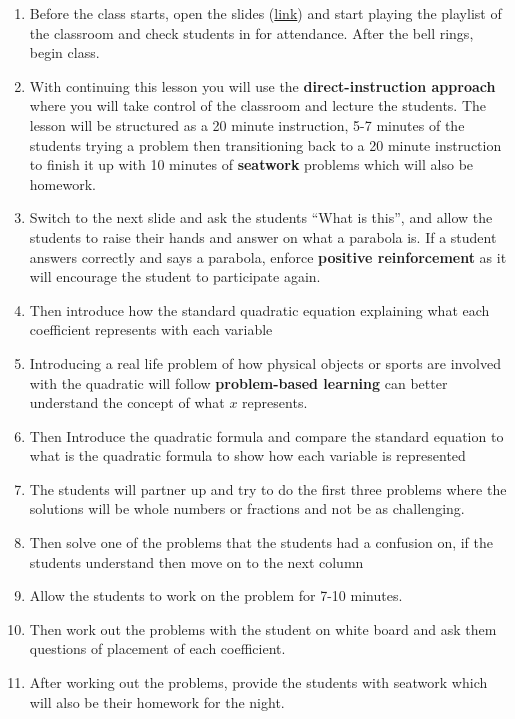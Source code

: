 \begin{enumerate}
    \item Before the class starts, open the slides (\href{https://docs.google.com/presentation/d/19ciZDfXd51fivbBudBNQqxBPUnCx569onL82jkyxO34/edit#slide=id.p}{link}) and start playing the playlist of the classroom and check students in for attendance. After the bell rings, begin class.
    \item With continuing this lesson you will use the \textbf{direct-instruction approach} where you will take control of the classroom and lecture the students. The lesson will be structured as a 20 minute instruction, 5-7 minutes of the students trying a problem then transitioning back to a 20 minute instruction to finish it up with 10 minutes of \textbf{seatwork} problems which will also be homework.
    \item Switch to the next slide and ask the students “What is this”, and allow the students to raise their hands and answer on what a parabola is. If a student answers correctly and says a parabola, enforce \textbf{positive reinforcement} as it will encourage the student to participate again. 
    \item Then introduce how the standard quadratic equation explaining what each coefficient represents with each variable 
    \item Introducing a real life problem of how physical objects or sports are involved with the quadratic will follow \textbf{problem-based learning} can better understand the concept of what $x$ represents.
    \item Then Introduce the quadratic formula and compare the standard equation to what is the quadratic formula to show how each variable is represented 
    \item The students will partner up and try to do the first three problems where the solutions will be whole numbers or fractions and not be as challenging.
    \item Then solve one of the problems that the students had a confusion on, if the students understand then move on to the next column
    \item Allow the students to work on the problem for 7-10 minutes.
    \item Then work out the problems with the student on white board and ask them questions of placement of each coefficient.
    \item After working out the problems, provide the students with seatwork which will also be their homework for the night.
\end{enumerate}